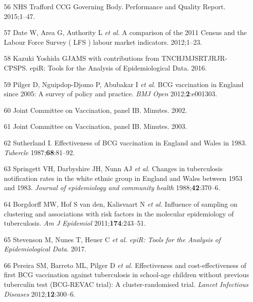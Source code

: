 \documentclass[11pt,twoside]{bristolthesis}
\begin{document}
  \leavevmode\hypertarget{ref-NHSTraffordCCGGoverningBody2015}{}%
  56 NHS Trafford CCG Governing Body. Performance and Quality Report. 2015;1--47.
  
  \leavevmode\hypertarget{ref-Date2012}{}%
  57 Date W, Area G, Authority L \emph{et al.} A comparison of the 2011 Census and the Labour Force Survey ( LFS ) labour market indicators. 2012;1--23.
  
  \leavevmode\hypertarget{ref-Stevenson2016}{}%
  58 Kazuki Yoshida GJAMS with contributions from TNCHJMJSRTJRJR-CPSPS. epiR: Tools for the Analysis of Epidemiological Data. 2016.
  
  \leavevmode\hypertarget{ref-Pilger2012b}{}%
  59 Pilger D, Nguipdop-Djomo P, Abubakar I \emph{et al.} BCG vaccination in England since 2005: A survey of policy and practice. \emph{BMJ Open} 2012;\textbf{2}:e001303.
  
  \leavevmode\hypertarget{ref-JVCIBCG2002}{}%
  60 Joint Committee on Vaccination, panel IB. Minutes. 2002.
  
  \leavevmode\hypertarget{ref-JVCIBCG2003}{}%
  61 Joint Committee on Vaccination, panel IB. Minutes. 2003.
  
  \leavevmode\hypertarget{ref-Sutherland1987a}{}%
  62 Sutherland I. Effectiveness of BCG vaccination in England and Wales in 1983. \emph{Tubercle} 1987;\textbf{68}:81--92.
  
  \leavevmode\hypertarget{ref-Springett1988}{}%
  63 Springett VH, Darbyshire JH, Nunn AJ \emph{et al.} Changes in tuberculosis notification rates in the white ethnic group in England and Wales between 1953 and 1983. \emph{Journal of epidemiology and community health} 1988;\textbf{42}:370--6.
  
  \leavevmode\hypertarget{ref-Borgdorff2011}{}%
  64 Borgdorff MW, Hof S van den, Kalisvaart N \emph{et al.} Influence of sampling on clustering and associations with risk factors in the molecular epidemiology of tuberculosis. \emph{Am J Epidemiol} 2011;\textbf{174}:243--51.
  
  \leavevmode\hypertarget{ref-EpiR}{}%
  65 Stevenson M, Nunes T, Heuer C \emph{et al.} \emph{epiR: Tools for the Analysis of Epidemiological Data}. 2017.
  
  \leavevmode\hypertarget{ref-Pereira2012}{}%
  66 Pereira SM, Barreto ML, Pilger D \emph{et al.} Effectiveness and cost-effectiveness of first BCG vaccination against tuberculosis in school-age children without previous tuberculin test (BCG-REVAC trial): A cluster-randomised trial. \emph{Lancet Infectious Diseases} 2012;\textbf{12}:300--6.
  
\end{document}
